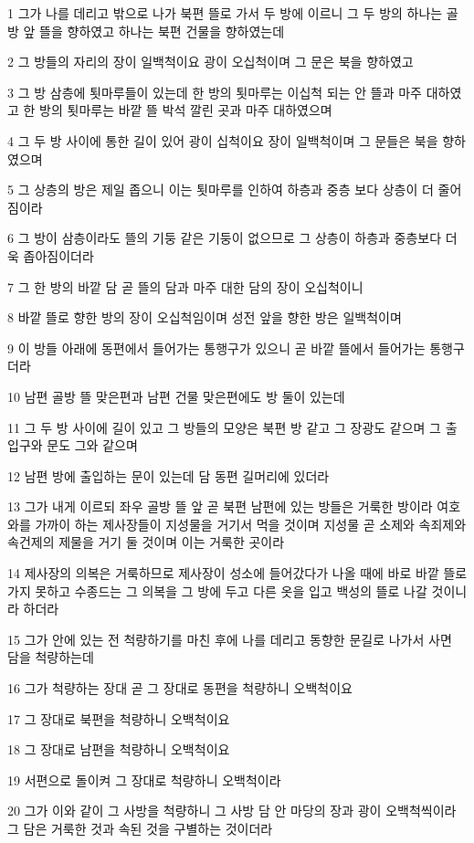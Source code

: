 \par 1 그가 나를 데리고 밖으로 나가 북편 뜰로 가서 두 방에 이르니 그 두 방의 하나는 골방 앞 뜰을 향하였고 하나는 북편 건물을 향하였는데
\par 2 그 방들의 자리의 장이 일백척이요 광이 오십척이며 그 문은 북을 향하였고
\par 3 그 방 삼층에 툇마루들이 있는데 한 방의 툇마루는 이십척 되는 안 뜰과 마주 대하였고 한 방의 툇마루는 바깥 뜰 박석 깔린 곳과 마주 대하였으며
\par 4 그 두 방 사이에 통한 길이 있어 광이 십척이요 장이 일백척이며 그 문들은 북을 향하였으며
\par 5 그 상층의 방은 제일 좁으니 이는 툇마루를 인하여 하층과 중층 보다 상층이 더 줄어짐이라
\par 6 그 방이 삼층이라도 뜰의 기둥 같은 기둥이 없으므로 그 상층이 하층과 중층보다 더욱 좁아짐이더라
\par 7 그 한 방의 바깥 담 곧 뜰의 담과 마주 대한 담의 장이 오십척이니
\par 8 바깥 뜰로 향한 방의 장이 오십척임이며 성전 앞을 향한 방은 일백척이며
\par 9 이 방들 아래에 동편에서 들어가는 통행구가 있으니 곧 바깥 뜰에서 들어가는 통행구더라
\par 10 남편 골방 뜰 맞은편과 남편 건물 맞은편에도 방 둘이 있는데
\par 11 그 두 방 사이에 길이 있고 그 방들의 모양은 북편 방 같고 그 장광도 같으며 그 출입구와 문도 그와 같으며
\par 12 남편 방에 출입하는 문이 있는데 담 동편 길머리에 있더라
\par 13 그가 내게 이르되 좌우 골방 뜰 앞 곧 북편 남편에 있는 방들은 거룩한 방이라 여호와를 가까이 하는 제사장들이 지성물을 거기서 먹을 것이며 지성물 곧 소제와 속죄제와 속건제의 제물을 거기 둘 것이며 이는 거룩한 곳이라
\par 14 제사장의 의복은 거룩하므로 제사장이 성소에 들어갔다가 나올 때에 바로 바깥 뜰로 가지 못하고 수종드는 그 의복을 그 방에 두고 다른 옷을 입고 백성의 뜰로 나갈 것이니라 하더라
\par 15 그가 안에 있는 전 척량하기를 마친 후에 나를 데리고 동향한 문길로 나가서 사면 담을 척량하는데
\par 16 그가 척량하는 장대 곧 그 장대로 동편을 척량하니 오백척이요
\par 17 그 장대로 북편을 척량하니 오백척이요
\par 18 그 장대로 남편을 척량하니 오백척이요
\par 19 서편으로 돌이켜 그 장대로 척량하니 오백척이라
\par 20 그가 이와 같이 그 사방을 척량하니 그 사방 담 안 마당의 장과 광이 오백척씩이라 그 담은 거룩한 것과 속된 것을 구별하는 것이더라


